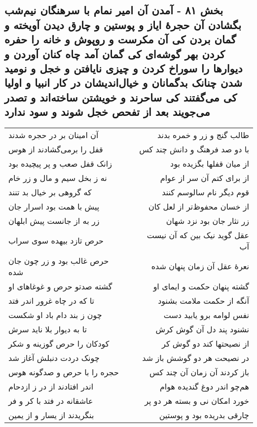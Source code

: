 \begin{center}
\section*{بخش ۸۱ - آمدن آن امیر نمام با سرهنگان نیم‌شب بگشادن آن حجرهٔ ایاز و پوستین و چارق دیدن آویخته و گمان بردن کی آن مکرست و روپوش و خانه را حفره کردن بهر گوشه‌ای کی گمان آمد چاه کنان  آوردن و دیوارها را سوراخ کردن و  چیزی نایافتن و خجل و نومید  شدن چنانک بدگمانان و خیال‌اندیشان در کار انبیا و اولیا کی  می‌گفتند کی ساحرند و خویشتن ساخته‌اند و تصدر می‌جویند بعد  از تفحص خجل شوند و سود ندارد}
\label{sec:sh081}
\begin{longtable}{l p{0.5cm} r}
آن امینان بر در حجره شدند
&&
طالب گنج و زر و خمره بدند
\\
قفل را برمی‌گشادند از هوس
&&
با دو صد فرهنگ و دانش چند کس
\\
زانک قفل صعب و پر پیچیده بود
&&
از میان قفلها بگزیده بود
\\
نه ز بخل سیم و مال و زر خام
&&
از برای کتم آن سر از عوام
\\
که گروهی بر خیال بد تنند
&&
قوم دیگر نام سالوسم کنند
\\
پیش با همت بود اسرار جان
&&
از خسان محفوظ‌تر از لعل کان
\\
زر به از جانست پیش ابلهان
&&
زر نثار جان بود نزد شهان
\\
حرص تازد بیهده سوی سراب
&&
عقل گوید نیک بین که آن نیست آب
\\
حرص غالب بود و زر چون جان شده
&&
نعرهٔ عقل آن زمان پنهان شده
\\
گشته صدتو حرص و غوغاهای او
&&
گشته پنهان حکمت و ایمای او
\\
تا که در چاه غرور اندر فتد
&&
آنگه از حکمت ملامت بشنود
\\
چون ز بند دام باد او شکست
&&
نفس لوامه برو یابید دست
\\
تا به دیوار بلا ناید سرش
&&
نشنود پند دل آن گوش کرش
\\
کودکان را حرص گوزینه و شکر
&&
از نصیحتها کند دو گوش کر
\\
چونک دردت دنبلش آغاز شد
&&
در نصیحت هر دو گوشش باز شد
\\
حجره را با حرص و صدگونه هوس
&&
باز کردند آن زمان آن چند کس
\\
اندر افتادند از در ز ازدحام
&&
هم‌چو اندر دوغ گندیده هوام
\\
عاشقانه در فتد با کر و فر
&&
خورد امکان نی و بسته هر دو پر
\\
بنگریدند از یسار و از یمین
&&
چارقی بدریده بود و پوستین
\\

\end{longtable}
\end{center}
